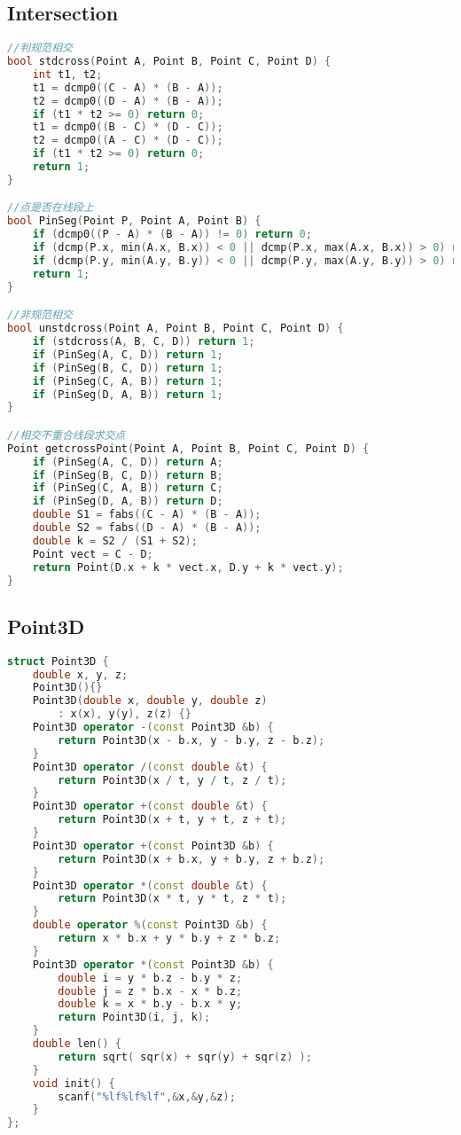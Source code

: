 \subsection{Intersection}
\begin{lstlisting}[language=C++]
//判规范相交
bool stdcross(Point A, Point B, Point C, Point D) {
	int t1, t2;
	t1 = dcmp0((C - A) * (B - A));
	t2 = dcmp0((D - A) * (B - A));
	if (t1 * t2 >= 0) return 0;
	t1 = dcmp0((B - C) * (D - C));
	t2 = dcmp0((A - C) * (D - C));
	if (t1 * t2 >= 0) return 0;
	return 1;
}

//点是否在线段上
bool PinSeg(Point P, Point A, Point B) {
	if (dcmp0((P - A) * (B - A)) != 0) return 0;
	if (dcmp(P.x, min(A.x, B.x)) < 0 || dcmp(P.x, max(A.x, B.x)) > 0) return 0;
	if (dcmp(P.y, min(A.y, B.y)) < 0 || dcmp(P.y, max(A.y, B.y)) > 0) return 0;
	return 1;
}

//非规范相交
bool unstdcross(Point A, Point B, Point C, Point D) {
	if (stdcross(A, B, C, D)) return 1;
	if (PinSeg(A, C, D)) return 1;
	if (PinSeg(B, C, D)) return 1;
	if (PinSeg(C, A, B)) return 1;
	if (PinSeg(D, A, B)) return 1;
}

//相交不重合线段求交点
Point getcrossPoint(Point A, Point B, Point C, Point D) {
	if (PinSeg(A, C, D)) return A;
	if (PinSeg(B, C, D)) return B;
	if (PinSeg(C, A, B)) return C;
	if (PinSeg(D, A, B)) return D;
	double S1 = fabs((C - A) * (B - A));
	double S2 = fabs((D - A) * (B - A));
	double k = S2 / (S1 + S2);
	Point vect = C - D;
	return Point(D.x + k * vect.x, D.y + k * vect.y);
}
\end{lstlisting}
\subsection{Point3D}
\begin{lstlisting}[language=C++]
struct Point3D {
	double x, y, z;
	Point3D(){}
	Point3D(double x, double y, double z)
		: x(x), y(y), z(z) {}
	Point3D operator -(const Point3D &b) {
		return Point3D(x - b.x, y - b.y, z - b.z);
	}
	Point3D operator /(const double &t) {
		return Point3D(x / t, y / t, z / t);
	}
	Point3D operator +(const double &t) {
		return Point3D(x + t, y + t, z + t);
	}
	Point3D operator +(const Point3D &b) {
		return Point3D(x + b.x, y + b.y, z + b.z);
	}
	Point3D operator *(const double &t) {
		return Point3D(x * t, y * t, z * t);
	}
	double operator %(const Point3D &b) {
		return x * b.x + y * b.y + z * b.z;
	}
	Point3D operator *(const Point3D &b) {
		double i = y * b.z - b.y * z;
		double j = z * b.x - x * b.z;
		double k = x * b.y - b.x * y;
		return Point3D(i, j, k);
	}
	double len() {
		return sqrt( sqr(x) + sqr(y) + sqr(z) );
	}
	void init() {
		scanf("%lf%lf%lf",&x,&y,&z);
	}
};
\end{lstlisting}
